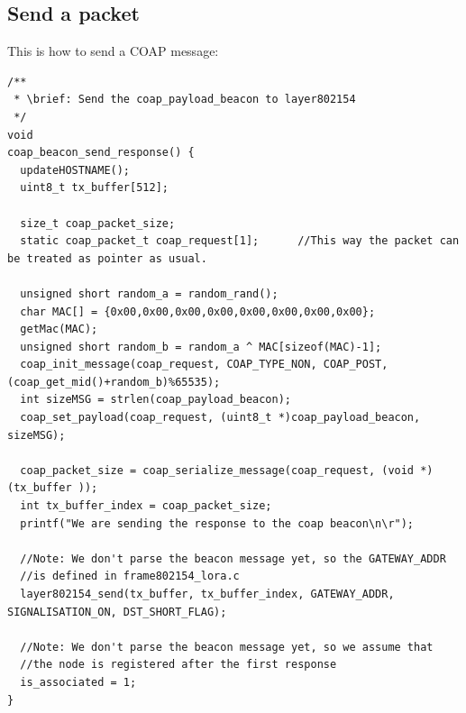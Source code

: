 \documentclass{article}
\begin{document}
\subsection{Send a packet}
This is how to send a COAP message:
\begin{verbatim}
/**
 * \brief: Send the coap_payload_beacon to layer802154
 */
void
coap_beacon_send_response() {
  updateHOSTNAME();
  uint8_t tx_buffer[512];

  size_t coap_packet_size;
  static coap_packet_t coap_request[1];      //This way the packet can be treated as pointer as usual.

  unsigned short random_a = random_rand();
  char MAC[] = {0x00,0x00,0x00,0x00,0x00,0x00,0x00,0x00};
  getMac(MAC);
  unsigned short random_b = random_a ^ MAC[sizeof(MAC)-1];
  coap_init_message(coap_request, COAP_TYPE_NON, COAP_POST, (coap_get_mid()+random_b)%65535);
  int sizeMSG = strlen(coap_payload_beacon);
  coap_set_payload(coap_request, (uint8_t *)coap_payload_beacon, sizeMSG);

  coap_packet_size = coap_serialize_message(coap_request, (void *)(tx_buffer ));
  int tx_buffer_index = coap_packet_size;
  printf("We are sending the response to the coap beacon\n\r");

  //Note: We don't parse the beacon message yet, so the GATEWAY_ADDR
  //is defined in frame802154_lora.c
  layer802154_send(tx_buffer, tx_buffer_index, GATEWAY_ADDR, SIGNALISATION_ON, DST_SHORT_FLAG);

  //Note: We don't parse the beacon message yet, so we assume that
  //the node is registered after the first response
  is_associated = 1;
}
\end{verbatim}
\end{document}
